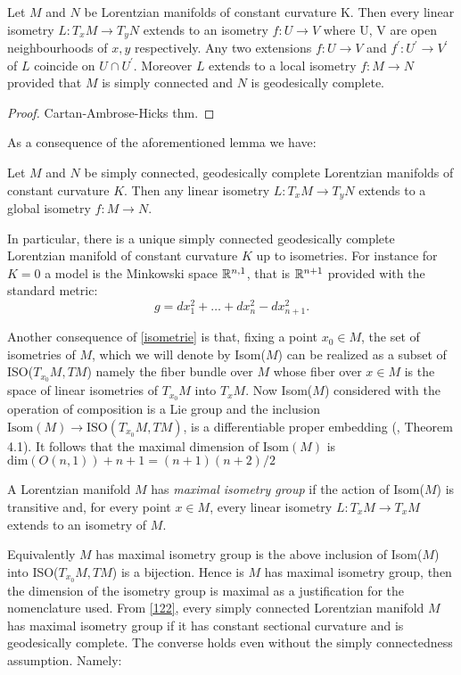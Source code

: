 \begin{lemma}\label{isometrie} Let $M$ and $N$ be Lorentzian manifolds of constant curvature K. Then every linear isometry $L:T_{x}M\to T_yN$ extends to an isometry $f:U\to V$ where U, V are open neighbourhoods of $x, y$ respectively. Any two extensions $f:U\to V$ and $f^{\prime}:U^{\prime} \to V^{\prime} $ of $L$ coincide on $U\cap U^{\prime}. $ Moreover $L$ extends to a local isometry $f:M\to N$ provided that $M$ is simply connected and $N$ is geodesically complete. 
\end{lemma}
\begin{proof}
    Cartan-Ambrose-Hicks thm.
\end{proof}
As a consequence of the aforementioned lemma we have: 
\begin{corollary}\label{122}
    Let $M$ and $N$ be simply connected, geodesically complete Lorentzian manifolds of constant curvature $K$. Then any linear isometry $L:T_xM\to T_yN$ extends to a global isometry $f:M\to N.$   
\end{corollary}

In particular, there is a unique simply connected geodesically complete Lorentzian manifold of constant curvature $K$ up to isometries. For instance for $K=0$ a model is the Minkowski space $\mathbb{R}^{n,1}$, that is $\mathbb{R}^{n+1}$ provided with the standard metric: 
\[
    g=dx_1^{2}+\dots+dx_n^{2}-dx_{n+1}^2.   
\]

Another consequence of \ref{isometrie} is that, fixing a point $x_0 \in M$, the set of isometries of $M$, which we will denote by Isom($M$) can be realized as a subset of ISO($T_{x_0}M, TM$) namely the fiber bundle over $M$ whose fiber over $x\in M$ is the space of linear isometries of $T_{x_0}M$ into $T_{x}M$. Now Isom($M$) considered with the operation of composition is a Lie group and the inclusion $\text{Isom}(M)\to \text{ISO}(T_{x_0}M, TM)$, is a differentiable proper embedding (\cite{okubo_1970}, Theorem 4.1). It follows that the maximal dimension of $\text{Isom}(M)$ is $\text{dim}(O(n,1))+n+1=(n+1)(n+2)/2$

\begin{definition}
    A Lorentzian manifold $M$ has \textit{maximal isometry group} if the action of Isom($M$) is transitive and, for every point $x \in M$, every linear isometry $L:T_{x}M\to T_xM$ extends to an isometry of $M$. 
\end{definition}

Equivalently $M$ has maximal isometry group is the above inclusion of Isom($M$) into ISO($T_{x_0}M, TM$) is a bijection. Hence is $M$ has maximal isometry group, then the dimension of the isometry group is maximal as a justification for the nomenclature used. 
From \ref{122}, every simply connected Lorentzian manifold $M$ has maximal isometry group if it has constant sectional curvature and is geodesically complete. The converse holds even without the simply connectedness assumption. Namely: 

